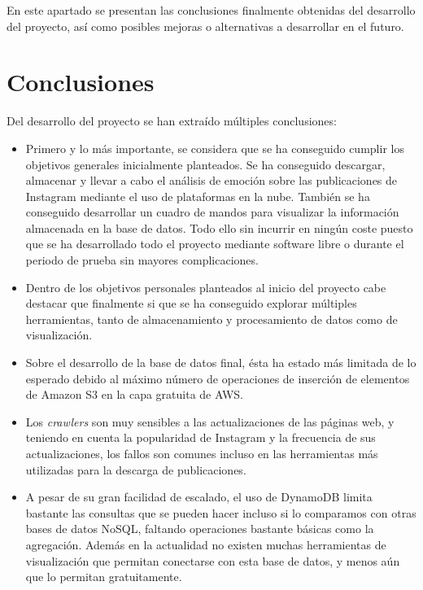 

En este apartado se presentan las conclusiones finalmente obtenidas del desarrollo del proyecto, así como posibles mejoras o alternativas a desarrollar en el futuro.

\section{Conclusiones}

Del desarrollo del proyecto se han extraído múltiples conclusiones: 

\begin{itemize}
    \item Primero y lo más importante, se considera que se ha conseguido cumplir los objetivos generales inicialmente planteados. Se ha conseguido descargar, almacenar y llevar a cabo el análisis de emoción sobre las publicaciones de Instagram mediante el uso de plataformas en la nube. También se ha conseguido desarrollar un cuadro de mandos para visualizar la información almacenada en la base de datos. Todo ello sin incurrir en ningún coste puesto que se ha desarrollado todo el proyecto mediante software libre o durante el periodo de prueba sin mayores complicaciones.
    \item Dentro de los objetivos personales planteados al inicio del proyecto cabe destacar que finalmente si que se ha conseguido explorar múltiples herramientas, tanto de almacenamiento y procesamiento de datos como de visualización.
    \item Sobre el desarrollo de la base de datos final, ésta ha estado más limitada de lo esperado debido al máximo número de operaciones de inserción de elementos de Amazon S3 en la capa gratuita de AWS.
    \item Los \textit{crawlers} son muy sensibles a las actualizaciones de las páginas web, y teniendo en cuenta la popularidad de Instagram y la frecuencia de sus actualizaciones, los fallos son comunes incluso en las herramientas más utilizadas para la descarga de publicaciones.
    \item A pesar de su gran facilidad de escalado, el uso de DynamoDB limita bastante las consultas que se pueden hacer incluso si lo comparamos con otras bases de datos NoSQL, faltando operaciones bastante básicas como la agregación. Además en la actualidad no existen muchas herramientas de visualización que permitan conectarse con esta base de datos, y menos aún que lo permitan gratuitamente.
\end{itemize}

